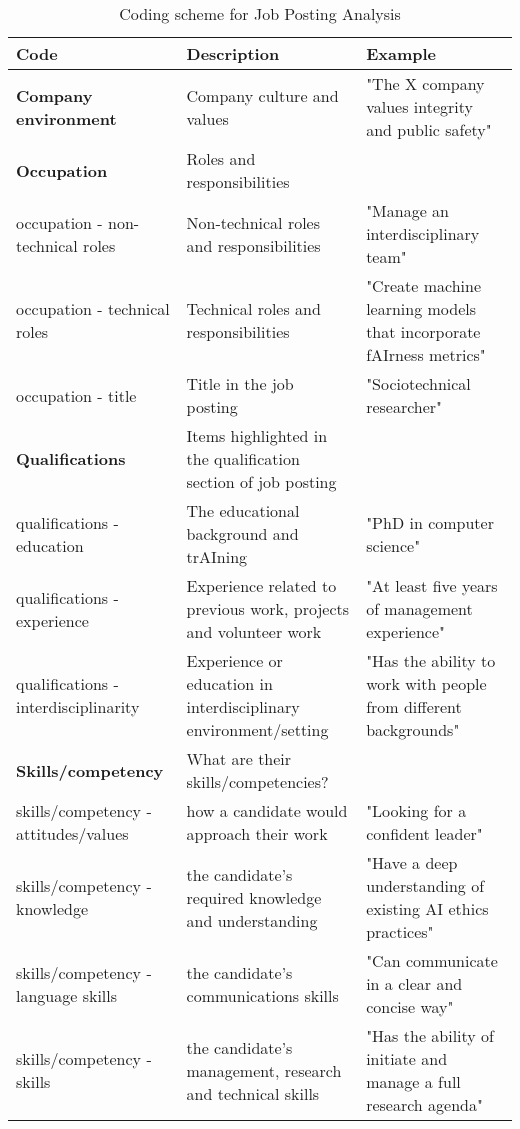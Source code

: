 \begin{table*}[h]
\caption{Coding scheme for Job Posting Analysis}
\label{tab:JP_coding_full}
\begin{tabular}{p{}p{}p{}}
\textbf{Code}                        & \textbf{Description}                                          & \textbf{Example}                                   \\ \hline
\textbf{Company environment}         & Company culture and values                                    & "The X company values integrity and public safety" \\ \hline
\textbf{Occupation}                  & Roles and responsibilities                                    &                                                    \\ \hline
occupation - non-technical roles     & Non-technical roles and responsibilities                      & "Manage an interdisciplinary team"                 \\ \hline
occupation - technical roles &
  Technical roles and responsibilities &
  "Create machine learning models that incorporate f\ac{AI}rness metrics" \\ \hline
occupation - title                   & Title in the job posting                                      & "Sociotechnical researcher"                        \\ \hline
\textbf{Qualifications}              & Items highlighted in the qualification section of job posting &                                                    \\ \hline
qualifications - education           & The educational background and tr\ac{AI}ning                       & "PhD in computer science"                          \\ \hline
qualifications - experience &
  Experience related to previous work, projects and volunteer work &
  "At least five years of management experience" \\ \hline
qualifications - interdisciplinarity &
  Experience or education in interdisciplinary environment/setting &
  "Has the ability to work with people from different backgrounds" \\ \hline
\textbf{Skills/competency}           & What are their skills/competencies?                           &                                                    \\ \hline
skills/competency - attitudes/values & how a candidate would approach their work                     & "Looking for a confident leader"                   \\ \hline
skills/competency - knowledge &
  the candidate's required knowledge and understanding &
  "Have a deep understanding of existing \ac{AI} ethics practices" \\ \hline
skills/competency - language skills &
  the candidate's communications skills &
  "Can communicate in a clear and concise way" \\ \hline
skills/competency - skills &
  the candidate's management, research and technical skills &
  "Has the ability of initiate and manage a full research agenda"
\end{tabular}
\end{table*}
